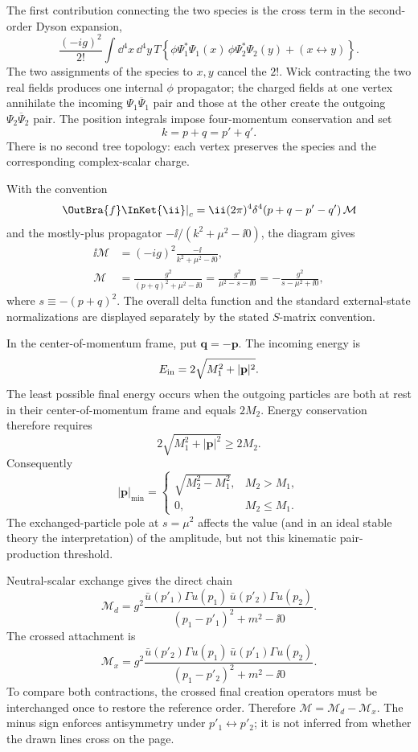 \begin{enumerate}
The first contribution connecting the two species is the cross term in
the second-order Dyson expansion,
\[
 \frac{(-ig)^2}{2!}\int \dd^4x\,\dd^4y\,
 T\!\left\{
 \phi\Psi_1^*\Psi_1(x)\,
 \phi\Psi_2^*\Psi_2(y)+(x\leftrightarrow y)
 \right\}.
\]
The two assignments of the species to \(x,y\) cancel the \(2!\).  Wick
contracting the two real fields produces one internal \(\phi\) propagator;
the charged fields at one vertex annihilate the incoming
\(\Psi_1\overline\Psi_1\) pair and those at the other create the outgoing
\(\Psi_2\overline\Psi_2\) pair.  The position integrals impose
four-momentum conservation and set
\[
 k=p+q=p'+q'.
\]
There is no second tree topology: each vertex preserves the species and
the corresponding complex-scalar charge.

With the convention
\[
 \left.\OutBra{f}\InKet{\ii}\right|_c
 =\ii(2\pi)^4\delta^4(p+q-p'-q')\,\mathcal M
\]
and the mostly-plus propagator \(-\ii/(k^2+\mu^2-\ii0)\), the diagram gives
\[
\begin{split}
 \ii\mathcal M
 &=(-ig)^2\frac{-\ii}{k^2+\mu^2-\ii0},\\
 \mathcal M
 &=\boxed{\frac{g^2}{(p+q)^2+\mu^2-\ii0}}
 =\frac{g^2}{\mu^2-s-\ii0}
 =-\frac{g^2}{s-\mu^2+\ii0},
\end{split}
\]
where \(s\equiv-(p+q)^2\).  The overall delta function and the standard
external-state normalizations are displayed separately by the stated
\(S\)-matrix convention.

In the center-of-momentum frame, put
\(\mathbf q=-\mathbf p\).  The incoming energy is
\[
 E_{\rm in}=2\sqrt{M_1^2+|\mathbf p|^2}.
\]
The least possible final energy occurs when the outgoing particles are
both at rest in their center-of-momentum frame and equals \(2M_2\).
Energy conservation therefore requires
\[
 2\sqrt{M_1^2+|\mathbf p|^2}\geq2M_2.
\]
Consequently
\[
 \boxed{
 |\mathbf p|_{\min}=
 \begin{cases}
 \sqrt{M_2^2-M_1^2},&M_2>M_1,\\[2pt]
 0,&M_2\leq M_1.
 \end{cases}}
\]
The exchanged-particle pole at \(s=\mu^2\) affects the value (and in an
ideal stable theory the interpretation) of the amplitude, but not this
kinematic pair-production threshold.

Neutral-scalar exchange gives the direct chain
\[
 \mathcal M_d=g^2
 \frac{\bar u(p'_1)\Gamma u(p_1)\,
       \bar u(p'_2)\Gamma u(p_2)}
 {(p_1-p'_1)^2+m^2-\ii0}.
\]
The crossed attachment is
\[
 \mathcal M_x=g^2
 \frac{\bar u(p'_2)\Gamma u(p_1)\,
       \bar u(p'_1)\Gamma u(p_2)}
 {(p_1-p'_2)^2+m^2-\ii0}.
\]
To compare both contractions, the crossed final creation operators must
be interchanged once to restore the reference order.  Therefore
\(\mathcal M=\mathcal M_d-\mathcal M_x\).  The minus sign enforces
antisymmetry under \(p'_1\leftrightarrow p'_2\); it is not inferred from
whether the drawn lines cross on the page.


\end{enumerate}
